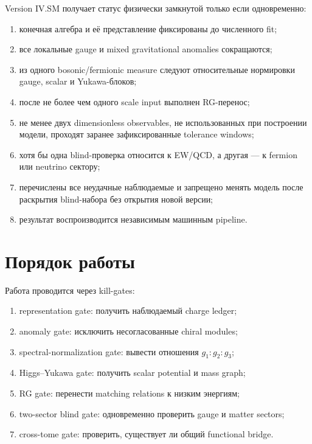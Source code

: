 \begin{protocol}
Version IV.SM получает статус физически замкнутой только если одновременно:
\begin{enumerate}
 \item конечная алгебра и её представление фиксированы до численного fit;
 \item все локальные gauge и mixed gravitational anomalies сокращаются;
 \item из одного bosonic/fermionic measure следуют относительные
 нормировки gauge, scalar и Yukawa-блоков;
 \item после не более чем одного scale input выполнен RG-перенос;
 \item не менее двух dimensionless observables, не использованных при
 построении модели, проходят заранее зафиксированные tolerance windows;
 \item хотя бы одна blind-проверка относится к EW/QCD, а другая --- к
 fermion или neutrino сектору;
 \item перечислены все неудачные наблюдаемые и запрещено менять модель после
 раскрытия blind-набора без открытия новой версии;
 \item результат воспроизводится независимым машинным pipeline.
\end{enumerate}
\end{protocol}

\section{Порядок работы}

Работа проводится через kill-gates:
\begin{enumerate}
 \item representation gate: получить наблюдаемый charge ledger;
 \item anomaly gate: исключить несогласованные chiral modules;
 \item spectral-normalization gate: вывести отношения \(g_1:g_2:g_3\);
 \item Higgs--Yukawa gate: получить scalar potential и mass graph;
 \item RG gate: перенести matching relations к низким энергиям;
 \item two-sector blind gate: одновременно проверить gauge и matter sectors;
 \item cross-tome gate: проверить, существует ли общий functional bridge.
\end{enumerate}

